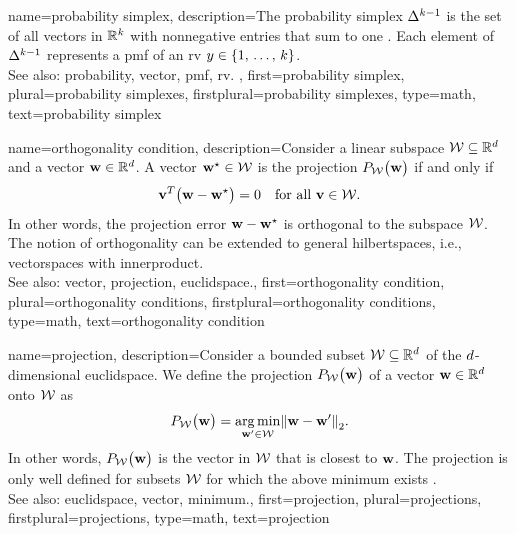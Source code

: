 {name={probability simplex},
	description={The \gls{probability} simplex
   		$\Delta^{k-1}$ is the set of all \glspl{vector} 
   		in $\mathbb{R}^k$ with nonnegative entries 
 		that sum to one \cite{BoydConvexBook}. Each element of $\Delta^{k-1}$ 
		represents a \gls{pmf} of an \gls{rv} $y \in \{1,\,\ldots,\,k\}$.
		\\
		See also: \gls{probability}, \gls{vector}, \gls{pmf}, \gls{rv}. },
  	first={probability simplex},
  	plural={probability simplexes},
  	firstplural={probability simplexes},
  	type=math,
  	text={probability simplex}
}

{name={orthogonality condition},
	description={Consider a linear \gls{subspace} 
		$\mathcal{W} \subseteq \mathbb{R}^{d}$ and a \gls{vector} 
		${\bf w} \in \mathbb{R}^{d}$. A \gls{vector} ${\bf w}^\star \in \mathcal{W}$ 
		is the \gls{projection} $P_{\mathcal{W}}\big( {\bf w}\big)$ if and only if
		\begin{equation}
			\nonumber
			\label{eq:orthogonality_condition_dict}
			{\bf v}^{T} \big( {\bf w} - {\bf w}^\star\big) = 0 
			\quad \text{for all } {\bf v} \in \mathcal{W} .
		\end{equation}
		In other words, the \gls{projection} error ${\bf w}-{\bf w}^\star$ is orthogonal to the
		\gls{subspace} $\mathcal{W}$. The notion of orthogonality can be extended to general 
            	\glspl{hilbertspace}, i.e., \glspl{vectorspace} with \gls{innerproduct}.
		\\
		See also: \gls{vector}, \gls{projection}, \gls{euclidspace}.},
	first={orthogonality condition},
	plural={orthogonality conditions},
	firstplural={orthogonality conditions},
	type=math,
	text={orthogonality condition}
}

{name={projection}, 
       	description={Consider a bounded subset 
		$\mathcal{W} \subseteq \mathbb{R}^{d}$ of 
		the $d$-dimensional \gls{euclidspace}. We define the projection 
		$P_{\mathcal{W}}\big( {\bf w}\big)$ of a \gls{vector} 
		${\bf w} \in \mathbb{R}^{d}$ onto $\mathcal{W}$ as
	   	\begin{equation} 
   	   		\nonumber
			\label{equ_def_proj_generic_dict}
  	    		\projection{\paramspace}{\weights} = \argmin_{\weights' \in \paramspace} \normgeneric{\weights - \weights'}{2}. 
        	    	\end{equation}
	    	In other words, $P_{\mathcal{W}}\big( {\bf w}\big)$ is the \gls{vector} in $\mathcal{W}$ 
	    	that is closest to ${\bf w}$. The projection is only well defined for subsets $\mathcal{W}$ 
	    	for which the above \gls{minimum} exists \cite{BoydConvexBook}.
		 			\\ 
	    	See also: \gls{euclidspace}, \gls{vector}, \gls{minimum}.},
	first={projection},
	plural={projections}, 
	firstplural={projections},
	type=math,
	text={projection}
}

